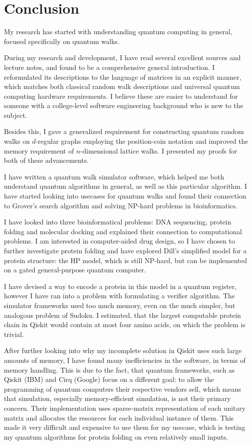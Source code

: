 \chapter{Conclusion}

My research has started with understanding quantum computing in general, focused specifically on quantum walks.

During my research and development, I have read several excellent sources \cite{Aharonov, KempeIntroduction, Portugal, Santha, XiaReview} and lecture notes, and found \cite{Portugal} to be a comprehensive general introduction. I reformulated its descriptions to the language of matrices in an explicit manner, which matches both classical random walk descriptions and universal quantum computing hardware requirements. I believe these are easier to understand for someone with a college-level software engineering background who is new to the subject.

Besides this, I gave a generalized requirement for constructing quantum random walks on $d$-regular graphs employing the position-coin notation and improved the memory requirement of $n$-dimensional lattice walks. I presented my proofs for both of these advancements.

I have written a quantum walk simulator software, which helped me both understand quantum algorithms in general, as well as this particular algorithm. I have started looking into usecases for quantum walks and found their connection to Grover's search algorithm and solving NP-hard problems in bioinformatics.

I have looked into three bioinformatical problems: DNA sequencing, protein folding and molecular docking and explained their connection to computational problems. I am interested in computer-aided drug design, so I have chosen to further investigate protein folding and have explored Dill's simplified model for a protein structure: the HP model, which is still NP-hard, but can be implemented on a gated general-purpose quantum computer.

I have devised a way to encode a protein in this model in a quantum register, however I have ran into a problem with formulating a verifier algorithm. The simulator frameworks used too much memory, even on the much simpler, but analogous problem of Sudoku. I estimated, that the largest computable protein chain in Qiskit would contain at most four amino acids, on which the problem is trivial.

After further looking into why my incomplete solution in Qiskit uses such large amounts of memory, I have found many inefficiencies in the software, in terms of memory handling. This is due to the fact, that quantum frameworks, such as Qiskit (IBM) and Cirq (Google) focus on a different goal: to allow the programming of quantum computers their respective vendors sell, which means that simulation, especially memory-efficient simulation, is not their primary concern. Their implementation uses sparse-matrix representation of each unitary matrix and allocates the resources for each individual instance of them. This made it very difficult and expensive to use them for my usecase, which is testing my quantum algorithms for protein folding on even relatively small inputs.

